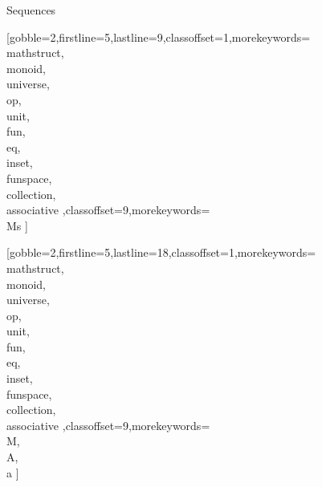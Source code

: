 \documentclass[lang={en,de}]{stex}
\begin{document}
  \begin{sfragment}{Sequences}


    [gobble=2,firstline=5,lastline=9,classoffset=1,morekeywords={
    \\mathstruct,\\monoid,\\universe,\\op,\\unit,\\fun,\\eq,\\inset,
    \\funspace,\\collection,\\associative
    },classoffset=9,morekeywords={
      \\Ms
    }]

    [gobble=2,firstline=5,lastline=18,classoffset=1,morekeywords={
    \\mathstruct,\\monoid,\\universe,\\op,\\unit,\\fun,\\eq,\\inset,
    \\funspace,\\collection,\\associative
    },classoffset=9,morekeywords={
      \\M,\\A,\\a
    }]
    
  \end{sfragment}
\end{document}
